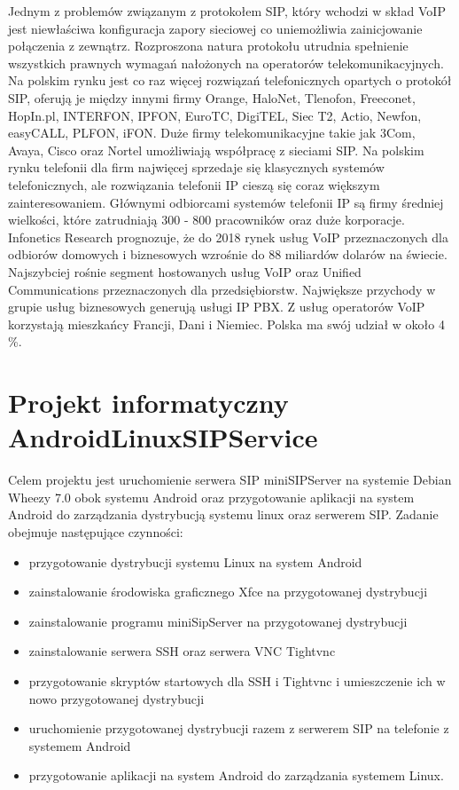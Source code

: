 Jednym z problemów związanym z protokołem SIP, który wchodzi w skład VoIP jest niewłaściwa konfiguracja zapory sieciowej co uniemożliwia zainicjowanie połączenia z zewnątrz. Rozproszona natura protokołu utrudnia spełnienie wszystkich prawnych wymagań nałożonych na operatorów telekomunikacyjnych. Na polskim rynku jest co raz więcej rozwiązań telefonicznych opartych o protokół SIP, oferują je między innymi firmy Orange, HaloNet, Tlenofon, Freeconet, HopIn.pl, INTERFON, IPFON, EuroTC, DigiTEL, Siec T2, Actio, Newfon, easyCALL, PLFON, iFON. Duże firmy telekomunikacyjne takie jak 3Com, Avaya, Cisco oraz Nortel umożliwiają współpracę z sieciami SIP. Na polskim rynku telefonii dla firm najwięcej sprzedaje się klasycznych systemów telefonicznych, ale rozwiązania telefonii IP cieszą się coraz większym zainteresowaniem. Głównymi odbiorcami systemów telefonii IP są firmy średniej wielkości, które zatrudniają 300 - 800 pracowników oraz duże korporacje. Infonetics Research prognozuje, że do 2018 rynek  usług VoIP przeznaczonych dla odbiorów domowych i biznesowych wzrośnie do 88 miliardów dolarów na świecie. Najszybciej rośnie segment hostowanych usług VoIP oraz Unified Communications przeznaczonych dla przedsiębiorstw. Największe przychody w grupie usług biznesowych generują usługi IP PBX. Z usług operatorów VoIP korzystają mieszkańcy Francji, Dani i Niemiec. Polska ma swój udział w około 4 \%.        
\newpage
\afterpage{\null\newpage}
\chapter{Projekt informatyczny AndroidLinuxSIPService}

Celem projektu jest uruchomienie serwera SIP miniSIPServer na systemie Debian Wheezy 7.0 obok systemu Android oraz przygotowanie aplikacji na system Android do zarządzania dystrybucją systemu linux oraz serwerem SIP. Zadanie obejmuje następujące czynności:

\begin{itemize}
	\item przygotowanie dystrybucji systemu Linux na system Android
	\item zainstalowanie środowiska graficznego Xfce na przygotowanej dystrybucji
	\item zainstalowanie programu miniSipServer na przygotowanej dystrybucji
	\item zainstalowanie serwera SSH oraz serwera VNC Tightvnc
	\item przygotowanie skryptów startowych dla SSH i Tightvnc i umieszczenie ich w nowo przygotowanej dystrybucji
	\item uruchomienie przygotowanej dystrybucji razem z serwerem SIP na telefonie z systemem Android
	\item przygotowanie aplikacji na system Android do zarządzania systemem Linux.
\end{itemize}
\newpage

